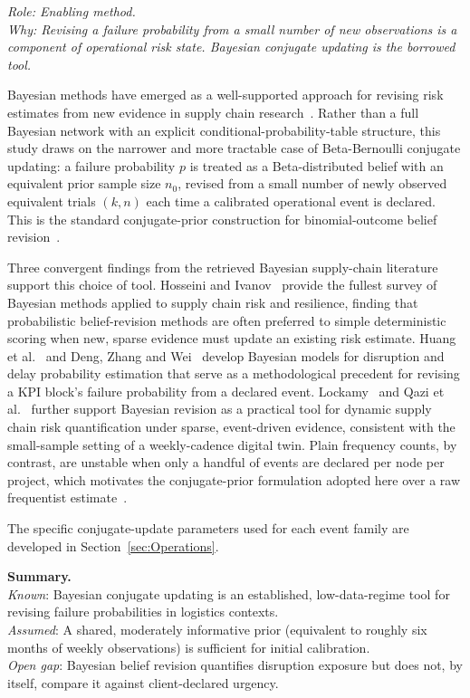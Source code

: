 \noindent\textit{Role: Enabling method. \\ Why: Revising a failure probability from a
small number of new observations is a component of operational risk state. Bayesian
conjugate updating is the borrowed tool.}

\medskip

Bayesian methods have emerged as a well-supported approach for revising risk estimates
from new evidence in supply chain research~\autocite{pearl1988probabilistic,koller2009probabilistic}. Rather than a full Bayesian network with an explicit
conditional-probability-table structure, this study draws on the narrower and more
tractable case of Beta-Bernoulli conjugate updating: a failure probability
$p$ is treated as a Beta-distributed belief with an equivalent prior sample size
$n_0$, revised from a small number of newly observed equivalent trials
$(k, n)$ each time a calibrated operational event is declared. This is the
standard conjugate-prior construction for binomial-outcome belief
revision~\autocite{pearl1988probabilistic,koller2009probabilistic}.

Three convergent findings from the retrieved Bayesian supply-chain literature support
this choice of tool. Hosseini and Ivanov~\autocite{hosseini2020bayesian} provide the fullest
survey of Bayesian methods applied to supply chain risk and
resilience, finding that probabilistic belief-revision methods are often preferred to
simple deterministic scoring when new, sparse evidence must update an existing risk
estimate. Huang et al.~\autocite{huang2020bayesian} and Deng, Zhang and
Wei~\autocite{deng2020prediction} develop Bayesian models for disruption and delay
probability estimation that serve as a methodological precedent for revising a KPI
block's failure probability from a declared event. Lockamy~\autocite{lockamy2011bayesian} and
Qazi et al.~\autocite{qazi2017dynamic} further support Bayesian revision as a practical
tool for dynamic supply chain risk quantification under sparse, event-driven evidence,
consistent with the small-sample setting of a weekly-cadence digital twin. Plain
frequency counts, by contrast, are unstable when only a handful of events are declared
per node per project, which motivates the conjugate-prior formulation adopted here
over a raw frequentist estimate~\autocite{zheng2020risk}.

The specific conjugate-update parameters used for each event family are developed in
Section~\ref{sec:Operations}.

\medskip
\noindent\textbf{Summary.} \\
\textit{Known}: Bayesian conjugate updating is an established, low-data-regime tool for
revising failure probabilities in logistics contexts. \\
\textit{Assumed}: A shared, moderately informative prior (equivalent to roughly
six months of weekly observations) is sufficient for initial calibration. \\
\textit{Open gap}: Bayesian belief revision quantifies disruption exposure but does not,
by itself, compare it against client-declared urgency.

